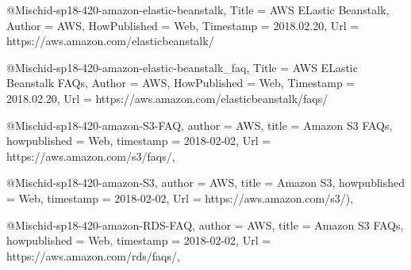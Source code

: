 
@Misc{hid-sp18-420-amazon-elastic-beanstalk,
  Title                    = {AWS ELastic Beanstalk},
  Author                   = {AWS},
  HowPublished             = {Web},
  Timestamp                = {2018.02.20},
  Url                      = {https://aws.amazon.com/elasticbeanstalk/}
}

@Misc{hid-sp18-420-amazon-elastic-beanstalk_faq,
  Title                    = {AWS ELastic Beanstalk FAQs},
  Author                   = {AWS},
  HowPublished             = {Web},
  Timestamp                = {2018.02.20},
  Url                      = { https://aws.amazon.com/elasticbeanstalk/faqs/}
}

@Misc{hid-sp18-420-amazon-S3-FAQ,
author = {AWS},
title = {Amazon S3 FAQs},
howpublished = {Web},
timestamp = {2018-02-02},
Url = {https://aws.amazon.com/s3/faqs/},
}

@Misc{hid-sp18-420-amazon-S3,
author = {AWS},
title = {Amazon S3},
howpublished = {Web},
timestamp = {2018-02-02},
Url = {https://aws.amazon.com/s3/)},
}

@Misc{hid-sp18-420-amazon-RDS-FAQ,
  author  = {AWS},
  title        = {Amazon S3 FAQs},
  howpublished = {Web},
  timestamp    = {2018-02-02},
  Url = {https://aws.amazon.com/rds/faqs/},
}
